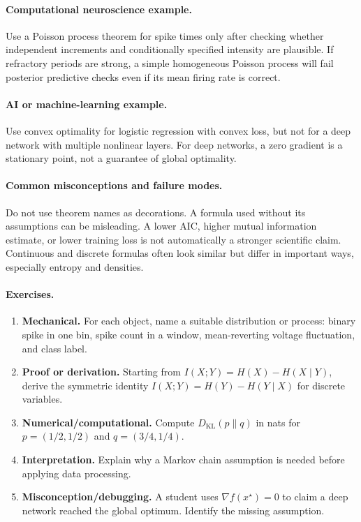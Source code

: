 \paragraph{Computational neuroscience example.}
Use a Poisson process theorem for spike times only after checking whether independent increments and conditionally specified intensity are plausible. If refractory periods are strong, a simple homogeneous Poisson process will fail posterior predictive checks even if its mean firing rate is correct.

\paragraph{AI or machine-learning example.}
Use convex optimality for logistic regression with convex loss, but not for a deep network with multiple nonlinear layers. For deep networks, a zero gradient is a stationary point, not a guarantee of global optimality.

\paragraph{Common misconceptions and failure modes.}
Do not use theorem names as decorations. A formula used without its assumptions can be misleading. A lower AIC, higher mutual information estimate, or lower training loss is not automatically a stronger scientific claim. Continuous and discrete formulas often look similar but differ in important ways, especially entropy and densities.

\paragraph{Exercises.}
\begin{enumerate}[label=\textbf{54.2.\arabic*.}, leftmargin=*]
\item \textbf{Mechanical.} For each object, name a suitable distribution or process: binary spike in one bin, spike count in a window, mean-reverting voltage fluctuation, and class label.
\item \textbf{Proof or derivation.} Starting from \(I(X;Y)=H(X)-H(X\mid Y)\), derive the symmetric identity \(I(X;Y)=H(Y)-H(Y\mid X)\) for discrete variables.
\item \textbf{Numerical/computational.} Compute \(D_{\mathrm{KL}}(p\|q)\) in nats for \(p=(1/2,1/2)\) and \(q=(3/4,1/4)\).
\item \textbf{Interpretation.} Explain why a Markov chain assumption is needed before applying data processing.
\item \textbf{Misconception/debugging.} A student uses \(\nabla f(x^\star)=0\) to claim a deep network reached the global optimum. Identify the missing assumption.
\end{enumerate}

